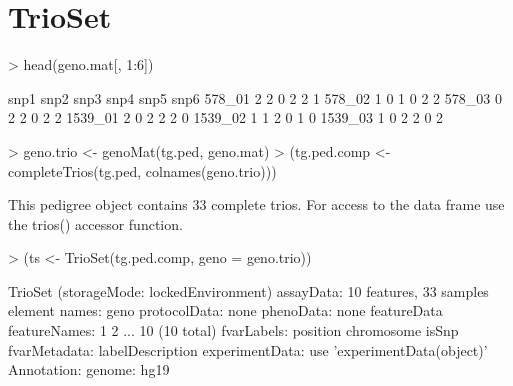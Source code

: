 \documentclass[10pt]{article}
\begin{document}
\section{TrioSet}
\begin{Schunk}
\begin{Sinput}
> head(geno.mat[, 1:6])
\end{Sinput}
\begin{Soutput}
        snp1 snp2 snp3 snp4 snp5 snp6
578_01     2    2    0    2    2    1
578_02     1    0    1    0    2    2
578_03     0    2    2    0    2    2
1539_01    2    0    2    2    2    0
1539_02    1    1    2    0    1    0
1539_03    1    0    2    2    0    2
\end{Soutput}
\begin{Sinput}
> geno.trio <- genoMat(tg.ped, geno.mat)
> (tg.ped.comp <- completeTrios(tg.ped, colnames(geno.trio)))
\end{Sinput}
\begin{Soutput}
This pedigree object contains 33 complete trios.
For access to the data frame use the trios() accessor function.
\end{Soutput}
\begin{Sinput}
> (ts <- TrioSet(tg.ped.comp, geno = geno.trio))
\end{Sinput}
\begin{Soutput}
TrioSet (storageMode: lockedEnvironment)
assayData: 10 features, 33 samples 
  element names: geno 
protocolData: none
phenoData: none
featureData
  featureNames: 1 2 ... 10 (10 total)
  fvarLabels: position chromosome isSnp
  fvarMetadata: labelDescription
experimentData: use 'experimentData(object)'
Annotation:  
genome:  hg19 
\end{Soutput}
\end{Schunk}
\end{document}
